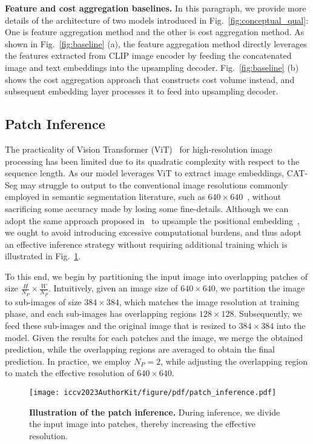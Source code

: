 \documentclass[10pt,twocolumn,letterpaper]{article}
\newcommand{\ours}{CAT-Seg\xspace}
\begin{document}
\smallbreak
\noindent\textbf{Feature and cost aggregation baselines.}
In this paragraph, we provide more details of the architecture of two models introduced in Fig.~\ref{fig:conceptual_qual}: One is feature aggregation method and the other is cost aggregation method. As shown in Fig.~\ref{fig:baseline} (a), the feature aggregation method directly leverages the features extracted from CLIP image encoder by feeding the concatenated image and text embeddings into the upsampling decoder. Fig.~\ref{fig:baseline} (b) shows the cost aggregation approach that constructs cost volume instead, and subsequent embedding layer processes it to feed into upsampling decoder. 


\subsection{Patch Inference}
The practicality of Vision Transformer (ViT)~\cite{dosovitskiy2020image} for high-resolution image processing has been limited due to its quadratic complexity with respect to the sequence length. As our model leverages ViT to extract image embeddings, \ours may struggle to output to the conventional image resolutions commonly employed in semantic segmentation literature, such as $640\times 640$~\cite{cheng2021per,ghiasi2022scaling}, without sacrificing some accuracy made by losing some fine-details. Although we can adopt the same approach proposed in~\cite{zhou2022extract} to upsample the positional embedding~\cite{zhou2022extract}, we ought to avoid introducing excessive computational burdens, and thus adopt an effective inference strategy without requiring additional training which is illustrated in Fig.~\ref{fig:patch-inference}.

To this end, we begin by partitioning the input image into overlapping patches of size $\frac{H}{N_P} \times \frac{W}{N_P}$. Intuitively, given an image size of $640 \times 640$, we partition the image to sub-images of size $384 \times 384$, which matches the image resolution at training phase, and each sub-images has overlapping regions $128 \times 128$. Subsequently, we feed these sub-images and the original image that is resized to $384 \times 384$ into the model. Given the results for each patches and the image, we merge the obtained prediction, while the overlapping regions are averaged to obtain the final prediction. In practice, we employ $N_P=2$,  while adjusting the overlapping region to match the effective resolution of $640\times 640$.

\begin{figure}[t]
    \centering
    \texttt{[image: iccv2023AuthorKit/figure/pdf/patch\_inference.pdf]}\hfill\\
    \vspace{-5pt}
    \caption{\textbf{Illustration of the patch inference.} During inference, we divide the input image into patches, thereby increasing the effective resolution.}
    \label{fig:patch-inference}\vspace{-5pt}
\end{figure} 
\end{document}
